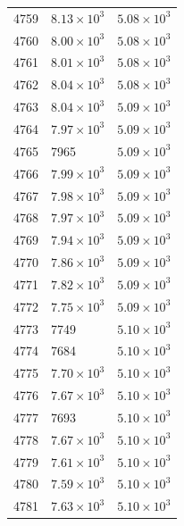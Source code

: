 \begin{table}[H]
\begin{tabular}{lll}
4759 & $\displaystyle 8.13 \times 10^{3}$ & $\displaystyle 5.08 \times 10^{3}$ \\
4760 & $\displaystyle 8.00 \times 10^{3}$ & $\displaystyle 5.08 \times 10^{3}$ \\
4761 & $\displaystyle 8.01 \times 10^{3}$ & $\displaystyle 5.08 \times 10^{3}$ \\
4762 & $\displaystyle 8.04 \times 10^{3}$ & $\displaystyle 5.08 \times 10^{3}$ \\
4763 & $\displaystyle 8.04 \times 10^{3}$ & $\displaystyle 5.09 \times 10^{3}$ \\
4764 & $\displaystyle 7.97 \times 10^{3}$ & $\displaystyle 5.09 \times 10^{3}$ \\
4765 & 7965 & $\displaystyle 5.09 \times 10^{3}$ \\
4766 & $\displaystyle 7.99 \times 10^{3}$ & $\displaystyle 5.09 \times 10^{3}$ \\
4767 & $\displaystyle 7.98 \times 10^{3}$ & $\displaystyle 5.09 \times 10^{3}$ \\
4768 & $\displaystyle 7.97 \times 10^{3}$ & $\displaystyle 5.09 \times 10^{3}$ \\
4769 & $\displaystyle 7.94 \times 10^{3}$ & $\displaystyle 5.09 \times 10^{3}$ \\
4770 & $\displaystyle 7.86 \times 10^{3}$ & $\displaystyle 5.09 \times 10^{3}$ \\
4771 & $\displaystyle 7.82 \times 10^{3}$ & $\displaystyle 5.09 \times 10^{3}$ \\
4772 & $\displaystyle 7.75 \times 10^{3}$ & $\displaystyle 5.09 \times 10^{3}$ \\
4773 & 7749 & $\displaystyle 5.10 \times 10^{3}$ \\
4774 & 7684 & $\displaystyle 5.10 \times 10^{3}$ \\
4775 & $\displaystyle 7.70 \times 10^{3}$ & $\displaystyle 5.10 \times 10^{3}$ \\
4776 & $\displaystyle 7.67 \times 10^{3}$ & $\displaystyle 5.10 \times 10^{3}$ \\
4777 & 7693 & $\displaystyle 5.10 \times 10^{3}$ \\
4778 & $\displaystyle 7.67 \times 10^{3}$ & $\displaystyle 5.10 \times 10^{3}$ \\
4779 & $\displaystyle 7.61 \times 10^{3}$ & $\displaystyle 5.10 \times 10^{3}$ \\
4780 & $\displaystyle 7.59 \times 10^{3}$ & $\displaystyle 5.10 \times 10^{3}$ \\
4781 & $\displaystyle 7.63 \times 10^{3}$ & $\displaystyle 5.10 \times 10^{3}$ \\

\end{tabular}
\end{table}
